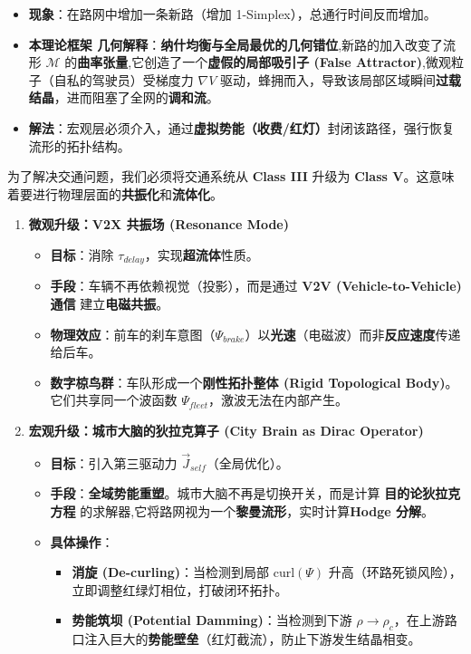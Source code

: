 \begin{itemize}
    \item   \textbf{现象}：在路网中增加一条新路（增加 1-Simplex），总通行时间反而增加。
    \item   \textbf{本理论框架 几何解释}：\textbf{纳什均衡与全局最优的几何错位},新路的加入改变了流形 $\mathcal{M}$ 的\textbf{曲率张量},它创造了一个\textbf{虚假的局部吸引子 (False Attractor)},微观粒子（自私的驾驶员）受梯度力 $\nabla V$ 驱动，蜂拥而入，导致该局部区域瞬间\textbf{过载结晶}，进而阻塞了全网的\textbf{调和流}。
    \item   \textbf{解法}：宏观层必须介入，通过\textbf{虚拟势能（收费/红灯）}封闭该路径，强行恢复流形的拓扑结构。
\end{itemize}




为了解决交通问题，我们必须将交通系统从 \textbf{Class III} 升级为 \textbf{Class V}。这意味着要进行物理层面的\textbf{共振化}和\textbf{流体化}。
\begin{enumerate}
    \item \textbf{微观升级：V2X 共振场 (Resonance Mode)}
    \begin{itemize}
        \item   \textbf{目标}：消除 $\tau_{delay}$，实现\textbf{超流体}性质。
        \item   \textbf{手段}：车辆不再依赖视觉（投影），而是通过 \textbf{V2V (Vehicle-to-Vehicle) 通信} 建立\textbf{电磁共振}。
        \item   \textbf{物理效应}：前车的刹车意图（$\Psi_{brake}$）以\textbf{光速}（电磁波）而非\textbf{反应速度}传递给后车。
        \item   \textbf{数字椋鸟群}：车队形成一个\textbf{刚性拓扑整体 (Rigid Topological Body)}。它们共享同一个波函数 $\Psi_{fleet}$，激波无法在内部产生。
    \end{itemize}

    \item \textbf{宏观升级：城市大脑的狄拉克算子 (City Brain as Dirac Operator)}
    \begin{itemize}
        \item   \textbf{目标}：引入第三驱动力 $\vec{J}_{self}$（全局优化）。
        \item   \textbf{手段}：\textbf{全域势能重塑}。城市大脑不再是切换开关，而是计算 \textbf{目的论狄拉克方程} 的求解器,它将路网视为一个\textbf{黎曼流形}，实时计算\textbf{Hodge 分解}。
        \item   \textbf{具体操作}：
        \begin{itemize}
            \item   \textbf{消旋 (De-curling)}：当检测到局部 $\text{curl}(\Psi)$ 升高（环路死锁风险），立即调整红绿灯相位，打破闭环拓扑。
            \item   \textbf{势能筑坝 (Potential Damming)}：当检测到下游 $\rho \to \rho_c$，在上游路口注入巨大的\textbf{势能壁垒}（红灯截流），防止下游发生结晶相变。
        \end{itemize}
    \end{itemize}
\end{enumerate}


